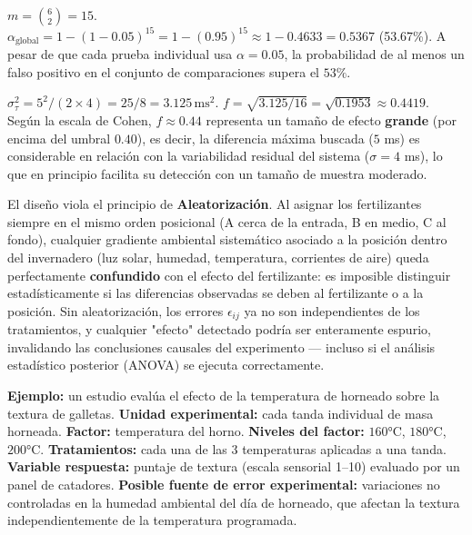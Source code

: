 \begin{solproblema}[prob:433c810]
	$m=\binom{6}{2}=15$. $\alpha_{\text{global}} = 1-(1-0.05)^{15} = 1-(0.95)^{15} \approx1-0.4633 = 0.5367$ (53.67\%). A pesar de que cada prueba individual usa $\alpha=0.05$, la probabilidad de al menos un falso positivo en el conjunto de comparaciones supera el $53\%$.
\end{solproblema}

\begin{solproblema}
	$\sigma_\tau^2 = 5^2/(2\times4) = 25/8 = 3.125\,\text{ms}^2$. $f = \sqrt{3.125/16} = \sqrt{0.1953}\approx0.4419$. Según la escala de Cohen, $f\approx0.44$ representa un tamaño de efecto \textbf{grande} (por encima del umbral $0.40$), es decir, la diferencia máxima buscada ($5$ ms) es considerable en relación con la variabilidad residual del sistema ($\sigma=4$ ms), lo que en principio facilita su detección con un tamaño de muestra moderado.
\end{solproblema}

\begin{solproblema}[prob:257933a]
	El diseño viola el principio de \textbf{Aleatorización}. Al asignar los fertilizantes siempre en el mismo orden posicional (A cerca de la entrada, B en medio, C al fondo), cualquier gradiente ambiental sistemático asociado a la posición dentro del invernadero (luz solar, humedad, temperatura, corrientes de aire) queda perfectamente \textbf{confundido} con el efecto del fertilizante: es imposible distinguir estadísticamente si las diferencias observadas se deben al fertilizante o a la posición. Sin aleatorización, los errores $\epsilon_{ij}$ ya no son independientes de los tratamientos, y cualquier "efecto" detectado podría ser enteramente espurio, invalidando las conclusiones causales del experimento — incluso si el análisis estadístico posterior (ANOVA) se ejecuta correctamente.
\end{solproblema}

\begin{solproblema}[prob:fb4917f]
	\textbf{Ejemplo:} un estudio evalúa el efecto de la temperatura de horneado sobre la textura de galletas. \textbf{Unidad experimental:} cada tanda individual de masa horneada. \textbf{Factor:} temperatura del horno. \textbf{Niveles del factor:} $160°$C, $180°$C, $200°$C. \textbf{Tratamientos:} cada una de las 3 temperaturas aplicadas a una tanda. \textbf{Variable respuesta:} puntaje de textura (escala sensorial 1–10) evaluado por un panel de catadores. \textbf{Posible fuente de error experimental:} variaciones no controladas en la humedad ambiental del día de horneado, que afectan la textura independientemente de la temperatura programada.
\end{solproblema}
